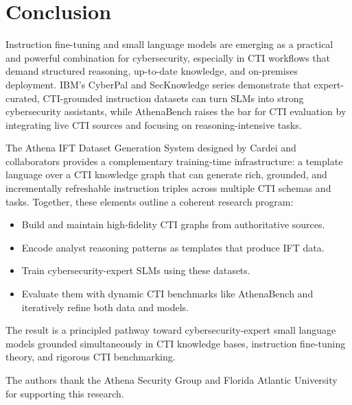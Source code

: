 \documentclass[sigconf]{acmart}
\begin{document}
\section{Conclusion}

Instruction fine-tuning and small language models are emerging as a practical and powerful combination for cybersecurity, especially in CTI workflows that demand structured reasoning, up-to-date knowledge, and on-premises deployment. IBM's CyberPal and SecKnowledge series demonstrate that expert-curated, CTI-grounded instruction datasets can turn SLMs into strong cybersecurity assistants, while AthenaBench raises the bar for CTI evaluation by integrating live CTI sources and focusing on reasoning-intensive tasks.\cite{levi2024cyberpal,levi2025toward,alam2025athenabench}

The Athena IFT Dataset Generation System designed by Cardei and collaborators provides a complementary training-time infrastructure: a template language over a CTI knowledge graph that can generate rich, grounded, and incrementally refreshable instruction triples across multiple CTI schemas and tasks.\cite{cardei2025ift} Together, these elements outline a coherent research program:

\begin{itemize}
  \item Build and maintain high-fidelity CTI graphs from authoritative sources.
  \item Encode analyst reasoning patterns as templates that produce IFT data.
  \item Train cybersecurity-expert SLMs using these datasets.
  \item Evaluate them with dynamic CTI benchmarks like AthenaBench and iteratively refine both data and models.
\end{itemize}

The result is a principled pathway toward cybersecurity-expert small language models grounded simultaneously in CTI knowledge bases, instruction fine-tuning theory, and rigorous CTI benchmarking.

\begin{acks}
The authors thank the Athena Security Group and Florida Atlantic University for supporting this research.
\end{acks}



\end{document}
